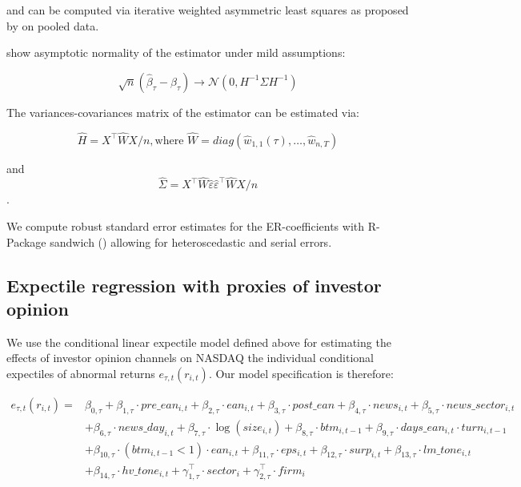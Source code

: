 \documentclass[]{article}
\begin{document}
and can be computed via iterative weighted asymmetric least squares as proposed by \cite{Newey1987} on pooled data.

\cite{BARRY2016} show asymptotic normality of the estimator under mild assumptions:

\[\sqrt{n}(\hat \beta_\tau - \beta_\tau)\rightarrow \mathcal N(0,H^{-1}\Sigma H^{-1})\]

The variances-covariances matrix of the estimator can be estimated via:

\[\hat H=X^\top\hat W X/n, \text{where } \hat W = diag(\hat w_{1,1}(\tau),\ldots,\hat w_{n,T})\]

and \[\hat \Sigma = X^\top\hat W\hat\varepsilon\hat \varepsilon^\top\hat WX/n\].

We compute robust standard error estimates for the ER-coefficients with R-Package sandwich (\cite{Zeileis2020}) allowing for heteroscedastic and serial errors.

\hypertarget{er-with-proxies-of-investor-opinion}{%
\subsection{Expectile regression with proxies of investor opinion}\label{er-with-proxies-of-investor-opinion}}

We use the conditional linear expectile model defined above for estimating the effects of investor opinion channels on NASDAQ the individual conditional expectiles of abnormal returns \(e_{\tau,t}(r_{i,t})\). Our model specification is therefore:

\begin{align}
e_{\tau,t}(r_{i,t}) = &\beta_{0,\tau}+\beta_{1,\tau}\cdot pre\_ean_{i,t} + \beta_{2,\tau}\cdot ean_{i,t} + \beta_{3,\tau}\cdot post\_ean + \beta_{4,\tau}\cdot news_{i,t} +\beta_{5,\tau}\cdot news\_sector_{i,t} \nonumber\\
&+ \beta_{6,\tau}\cdot news\_day_{i,t}  + \beta_{7,\tau}\cdot \log(size_{i,t}) + \beta_{8,\tau} \cdot btm_{i,t-1} + \beta_{9,\tau}\cdot days\_ean_{i,t}\cdot turn_{i,t-1}\nonumber\\
&+ \beta_{10,\tau}\cdot (btm_{i,t-1}<1)\cdot ean_{i,t} + \beta_{11,\tau}\cdot eps_{i,t}  + \beta_{12,\tau}\cdot surp_{i,t} + \beta_{13,\tau}\cdot lm\_tone_{i,t} \nonumber\\
&+ \beta_{14,\tau}\cdot hv\_tone_{i,t} + \gamma_{1,\tau}^{\top}\cdot sector_{i}+ \gamma_{2,\tau}^\top\cdot firm_{i}\label{eq:mod0}
\end{align}
\end{document}
